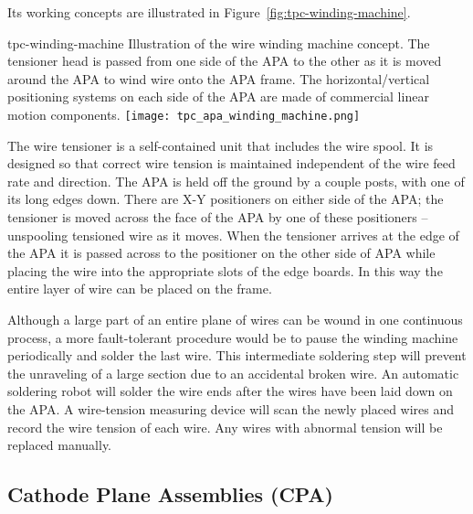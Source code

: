 Its working concepts are illustrated in
Figure~\ref{fig:tpc-winding-machine}.
\begin{cdrfigure}{tpc-winding-machine}
{Illustration of the wire winding machine concept.  The tensioner 
head is passed from one side of the APA to the other as it is moved 
around the APA to wind wire onto the APA frame.  The horizontal/vertical 
positioning systems on each side of the APA are made of commercial linear motion components. }
\texttt{[image: tpc\_apa\_winding\_machine.png]}
\end{cdrfigure}
The wire tensioner is a self-contained unit that includes the wire
spool.  It is designed so that correct wire tension is maintained
independent of the wire feed rate and direction.  The APA is held off
the ground by a couple posts, with one of its long edges down.  There
are X-Y positioners on either side of the APA; the tensioner is moved
across the face of the APA by one of these positioners -- unspooling
tensioned wire as it moves.  When the tensioner arrives at the edge of
the APA it is passed across to the positioner on the other side of APA
while placing the wire into the appropriate slots of the edge
boards. In this way the entire layer of wire can be placed on the
frame.

Although a large part of an entire plane of wires can be wound in one
continuous process, a more fault-tolerant procedure would be to pause
the winding machine periodically and solder the last wire. This
intermediate soldering step will prevent the unraveling of a large
section due to an accidental broken wire.  An automatic soldering
robot will solder the wire ends after the wires have been laid down on
the APA. A wire-tension measuring device will scan the newly placed
wires and record the wire tension of each wire. Any wires with
abnormal tension will be replaced manually.



\subsection{Cathode Plane Assemblies (CPA)}
\label{subsec:fd-ref-cpa}

